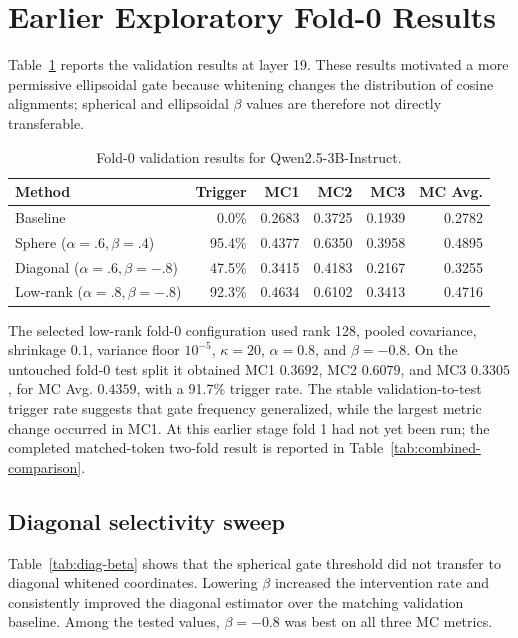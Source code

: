 \documentclass[11pt]{article}
\begin{document}
\section{Earlier Exploratory Fold-0 Results}

Table~\ref{tab:validation} reports the validation results at layer 19.  These
results motivated a more permissive ellipsoidal gate because whitening changes
the distribution of cosine alignments; spherical and ellipsoidal $\beta$ values
are therefore not directly transferable.

\begin{table}[ht]
\centering
\caption{Fold-0 validation results for Qwen2.5-3B-Instruct.}
\label{tab:validation}
\begin{tabular}{lrrrrr}
\toprule
Method & Trigger & MC1 & MC2 & MC3 & MC Avg.\\
\midrule
Baseline & 0.0\% & 0.2683 & 0.3725 & 0.1939 & 0.2782\\
Sphere ($\alpha=.6,\beta=.4$) & 95.4\% & 0.4377 & 0.6350 & 0.3958 & 0.4895\\
Diagonal ($\alpha=.6,\beta=-.8$) & 47.5\% & 0.3415 & 0.4183 & 0.2167 & 0.3255\\
Low-rank ($\alpha=.8,\beta=-.8$) & 92.3\% & 0.4634 & 0.6102 & 0.3413 & 0.4716\\
\bottomrule
\end{tabular}
\end{table}

The selected low-rank fold-0 configuration used rank 128, pooled covariance,
shrinkage $0.1$, variance floor $10^{-5}$, $\kappa=20$, $\alpha=0.8$, and
$\beta=-0.8$.  On the untouched fold-0 test split it obtained MC1 $0.3692$,
MC2 $0.6079$, and MC3 $0.3305$, for MC Avg. $0.4359$, with a 91.7\% trigger
rate.  The stable validation-to-test trigger rate suggests that gate frequency
generalized, while the largest metric change occurred in MC1. At this earlier
stage fold 1 had not yet been run; the completed matched-token two-fold result
is reported in Table~\ref{tab:combined-comparison}.

\subsection{Diagonal selectivity sweep}

Table~\ref{tab:diag-beta} shows that the spherical gate threshold did not
transfer to diagonal whitened coordinates.  Lowering $\beta$ increased the
intervention rate and consistently improved the diagonal estimator over the
matching validation baseline.  Among the tested values, $\beta=-0.8$ was best
on all three MC metrics.
\end{document}

